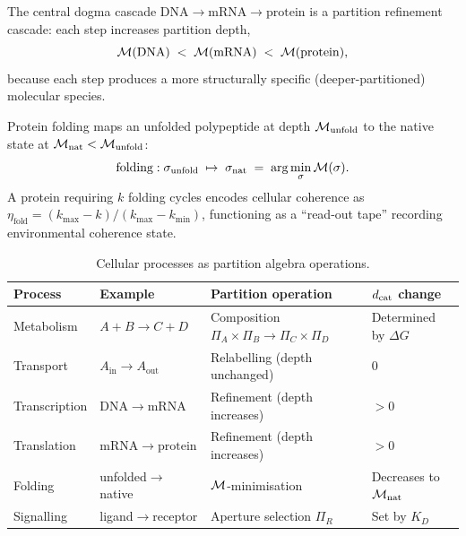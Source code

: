 \begin{definition}
\label{def:gene-expression}
The central dogma cascade $\mathrm{DNA}\to\mathrm{mRNA}\to\mathrm{protein}$
is a partition refinement cascade: each step increases partition depth,
\[
    \mathcal{M}(\mathrm{DNA}) \;<\; \mathcal{M}(\mathrm{mRNA}) \;<\; \mathcal{M}(\mathrm{protein}),
\]
because each step produces a more structurally specific (deeper-partitioned)
molecular species.
\end{definition}

\begin{definition}
\label{def:folding-obs}
Protein folding maps an unfolded polypeptide at depth $\mathcal{M}_\mathrm{unfold}$
to the native state at $\mathcal{M}_\mathrm{nat} < \mathcal{M}_\mathrm{unfold}$:
\[
    \text{folding} : \sigma_\mathrm{unfold} \;\mapsto\; \sigma_\mathrm{nat}
    \;=\; \arg\min_\sigma \mathcal{M}(\sigma).
\]
A protein requiring $k$ folding cycles encodes cellular coherence as
$\eta_\mathrm{fold} = (k_\mathrm{max} - k)/(k_\mathrm{max} - k_\mathrm{min})$,
functioning as a ``read-out tape'' recording environmental coherence state.
\end{definition}

\begin{table}[!htbp]
\centering
\caption{Cellular processes as partition algebra operations.}
\label{tab:process-algebra}
\begin{tabular}{llll}
\toprule
\textbf{Process} & \textbf{Example} & \textbf{Partition operation}
    & \textbf{$d_{\mathrm{cat}}$ change} \\
\midrule
Metabolism   & $A+B\to C+D$      & Composition $\Pi_A\times\Pi_B\to\Pi_C\times\Pi_D$
    & Determined by $\Delta G$ \\
Transport    & $A_\mathrm{in}\to A_\mathrm{out}$ & Relabelling (depth unchanged)
    & $0$ \\
Transcription & $\mathrm{DNA}\to\mathrm{mRNA}$ & Refinement (depth increases)
    & $> 0$ \\
Translation  & $\mathrm{mRNA}\to\mathrm{protein}$ & Refinement (depth increases)
    & $> 0$ \\
Folding      & unfolded$\to$native & $\mathcal{M}$-minimisation
    & Decreases to $\mathcal{M}_\mathrm{nat}$ \\
Signalling   & ligand$\to$receptor & Aperture selection $\Pi_R$
    & Set by $K_D$ \\
\bottomrule
\end{tabular}
\end{table}

